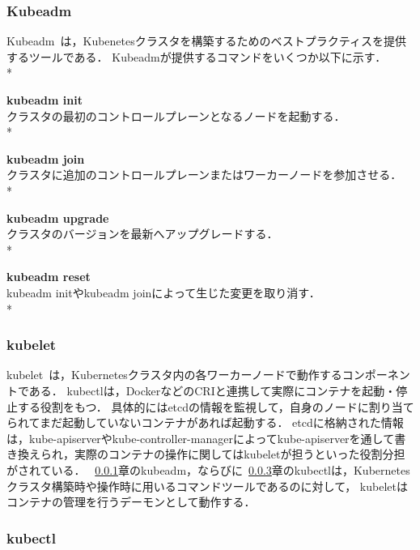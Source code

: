 \subsubsection{Kubeadm}
\label{background:container-orchestration-system:kubernetes:kubeadm}

Kubeadm~\cite{Kubeadm}は，Kubenetesクラスタを構築するためのベストプラクティスを提供するツールである．
Kubeadmが提供するコマンドをいくつか以下に示す．\\*

{\bf kubeadm init}\\
クラスタの最初のコントロールプレーンとなるノードを起動する．\\*

{\bf kubeadm join}\\
クラスタに追加のコントロールプレーンまたはワーカーノードを参加させる．\\*

{\bf kubeadm upgrade}\\
クラスタのバージョンを最新へアップグレードする．\\*

{\bf kubeadm reset}\\
kubeadm initやkubeadm joinによって生じた変更を取り消す．\\*

\subsubsection{kubelet}
\label{background:container-orchestration-system:kubernetes:kubelet}

kubelet~\cite{kubelet}は，Kubernetesクラスタ内の各ワーカーノードで動作するコンポーネントである．
kubectlは，DockerなどのCRIと連携して実際にコンテナを起動・停止する役割をもつ．
具体的にはetcdの情報を監視して，自身のノードに割り当てられてまだ起動していないコンテナがあれば起動する．
etcdに格納された情報は，kube-apiserverやkube-controller-managerによってkube-apiserverを通して書き換えられ，実際のコンテナの操作に関してはkubeletが担うといった役割分担がされている．
~\ref{background:container-orchestration-system:kubernetes:kubeadm}章のkubeadm，ならびに~\ref{background:container-orchestration-system:kubernetes:kubectl}章のkubectlは，Kubernetesクラスタ構築時や操作時に用いるコマンドツールであるのに対して，
kubeletはコンテナの管理を行うデーモンとして動作する．

\subsubsection{kubectl}
\label{background:container-orchestration-system:kubernetes:kubectl}


